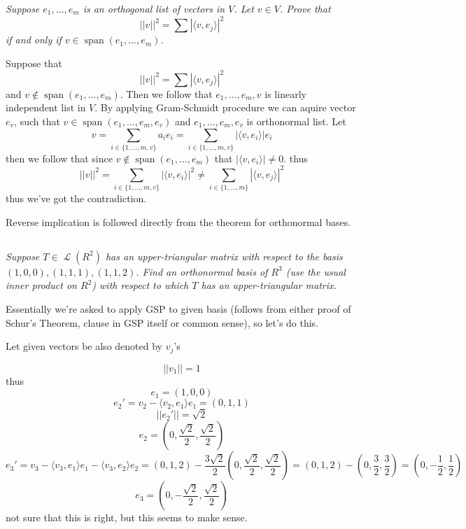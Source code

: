 \documentclass[11pt,oneside,titlepage]{book}
\DeclareMathOperator \map {\mathcal {L}}
\DeclareMathOperator \Span {span}
\newcommand{\eangle}[1]{\langle #1 \rangle}
\begin{document}
\textit{Suppose $e_1, ..., e_m$ is an orthogonal list of vectors in $V$. Let $v \in V$. Prove
  that }
$$||v||^2 = \sum{|\eangle{v, e_j}|^2}$$
\textit{if and only if $v \in \Span(e_1, ..., e_m)$.}

Suppose that
$$||v||^2 = \sum{|\eangle{v, e_j}|^2}$$
and $v \notin \Span(e_1, ..., e_m)$. Then we follow that  $e_1, ..., e_m, v$ is linearly independent
list in $V$. By applying Gram-Schmidt procedure we can aquire vector $e_v$, such that
$v \in \Span(e_1, ..., e_m, e_v)$
and $e_1, ..., e_m, e_v$ is orthonormal list. Let
$$v = \sum_{i \in \{1, ..., m, v\}}{a_i e_i} = \sum_{i \in \{1, ..., m, v\}}{|\eangle{v, e_i}| e_i}$$
then we follow that since $v \notin \Span(e_1, ..., e_m)$ that $|\eangle{v, e_i}| \neq 0$.
thus
$$||v||^2 =  \sum_{i \in \{1, ..., m, v\}}{|\eangle{v, e_i}|^2} \neq
\sum_{i \in \{1, ..., m\}}{|\eangle{v, e_j}|^2}$$
thus we've got the contradiction.

Reverse implication is followed directly from the theorem for orthonormal bases.

\subsection{}

\textit{Suppose $T \in \map(R^2)$ has an upper-triangular matrix with respect to the basis
  $(1, 0, 0), (1, 1, 1), (1, 1, 2)$. Find an orthonormal basis of $R^3$ (use the usual inner product
  on $R^2$) with respect to which $T$ has an upper-triangular matrix.}

Essentially we're asked to apply GSP to given basis (follows from either proof of
Schur's Theorem, clause in GSP itself or common sense), so let's do this.

Let given vectors be also denoted by $v_j$'s

$$||v_1|| = 1$$
thus
$$e_1 = (1, 0, 0)$$
$$e_2' = v_2 - \eangle{v_2, e_1}e_1 = (0, 1, 1)$$
$$||e_2'|| = \sqrt{2}$$
$$e_2 = (0, \frac{\sqrt{2}}{2}, \frac{\sqrt{2}}{2})$$
$$e_3' = v_3 - \eangle{v_3, e_1}e_1 - \eangle{v_3, e_2}e_2 =
(0, 1, 2) - \frac{3 \sqrt{2}}{2}(0,\frac{\sqrt{2}}{2}, \frac{\sqrt{2}}{2}) =
(0, 1, 2) - (0, \frac{3}{2}, \frac{3}{2}) = (0, - \frac{1}{2}, \frac{1}{2})$$
$$e_3 = (0, - \frac{\sqrt{2}}{2}, \frac{\sqrt{2}}{2})$$
not sure that this is right, but this seems to make sense.

\subsection{}
\end{document}
